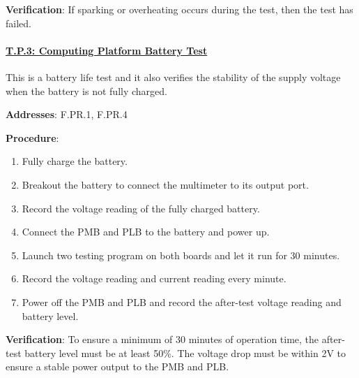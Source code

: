 \textbf{Verification}: 
If sparking or overheating occurs during the test, then the test has failed.

\paragraph{\underline{T.P.3: Computing Platform Battery Test}}

This is a battery life test and it also verifies the stability of the supply voltage when the battery is not fully charged.

\textbf{Addresses}: F.PR.1, F.PR.4

\textbf{Procedure}:
\begin{enumerate}[noitemsep]
    \item Fully charge the battery.
    \item Breakout the battery to connect the multimeter to its output port.
    \item Record the voltage reading of the fully charged battery. 
    \item Connect the PMB and PLB to the battery and power up.
    \item Launch two testing program on both boards and let it run for 30 minutes.
    \item Record the voltage reading and current reading every minute.
    \item Power off the PMB and PLB and record the after-test voltage reading and battery level.
\end{enumerate}

\textbf{Verification}: 
To ensure a minimum of 30 minutes of operation time, the after-test battery level must be at least 50\%. The voltage drop must be within 2V to ensure a stable power output to the PMB and PLB.
